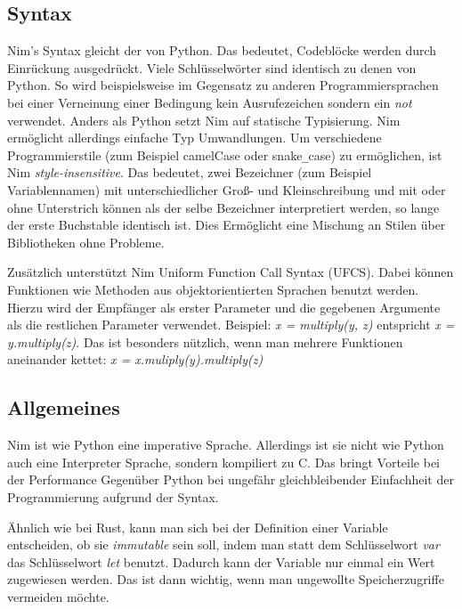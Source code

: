 \documentclass[11pt]{report}
\begin{document}
\subsection{Syntax}
Nim's Syntax gleicht der von Python. Das bedeutet, Codeblöcke werden durch Einrückung ausgedrückt. Viele  Schlüsselwörter sind identisch zu denen von Python. So wird beispielsweise im Gegensatz zu anderen Programmiersprachen bei einer Verneinung einer Bedingung kein Ausrufezeichen sondern ein \emph{not} verwendet. Anders als Python setzt Nim auf statische Typisierung. Nim ermöglicht allerdings einfache Typ Umwandlungen.
\newline
Um verschiedene Programmierstile (zum Beispiel camelCase oder snake\verb|_|case) zu ermöglichen, ist Nim \emph{style-insensitive}. Das bedeutet, zwei Bezeichner (zum Beispiel Variablennamen) mit unterschiedlicher Groß- und Kleinschreibung und mit oder ohne Unterstrich können als der selbe Bezeichner interpretiert werden, so lange der erste Buchstable identisch ist. Dies Ermöglicht eine Mischung an Stilen über Bibliotheken ohne Probleme.

Zusätzlich unterstützt Nim Uniform Function Call Syntax (UFCS). Dabei können Funktionen wie Methoden aus objektorientierten Sprachen benutzt werden. Hierzu wird der Empfänger als erster Parameter und die gegebenen Argumente als die restlichen Parameter verwendet. Beispiel:
\newline
\emph{x = multiply(y, z)} entspricht \emph{x = y.multiply(z)}.
\newline
Das ist besonders nützlich, wenn man mehrere Funktionen aneinander kettet:
\newline
\emph{x = x.muliply(y).multiply(z)}

\subsection{Allgemeines}
Nim ist wie Python eine imperative Sprache. Allerdings ist sie nicht wie Python auch eine Interpreter Sprache, sondern kompiliert zu C. Das bringt Vorteile bei der Performance Gegenüber Python bei ungefähr gleichbleibender Einfachheit der Programmierung aufgrund der Syntax.

Ähnlich wie bei Rust, kann man sich bei der Definition einer Variable entscheiden, ob sie \emph{immutable} sein soll, indem man statt dem Schlüsselwort \emph{var} das Schlüsselwort \emph{let} benutzt. Dadurch kann der Variable nur einmal ein Wert zugewiesen werden. Das ist dann wichtig, wenn man ungewollte Speicherzugriffe vermeiden möchte.
\end{document}
